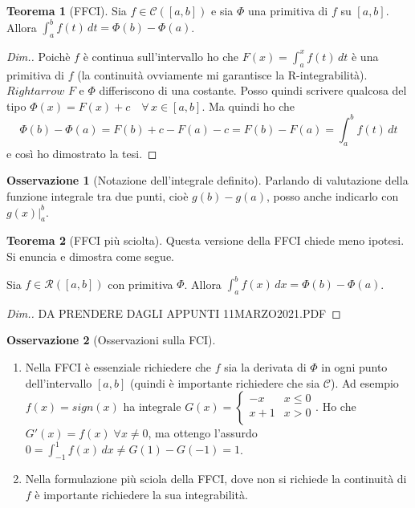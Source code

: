 \documentclass{article}
\theoremstyle{definition}
\newtheorem{theorem}{Teorema}[section]
\theoremstyle{definition}
\theoremstyle{definition}
\theoremstyle{definition}
\newtheorem{remark}{Osservazione}[section]
\theoremstyle{definition}
\theoremstyle{definition}
\begin{document}
\begin{theorem}[FFCI]
    Sia $f\in\mathcal{C}([a,b])$ e sia $\varPhi$ una primitiva di $f$ su $[a,b]$. Allora $\displaystyle{\int_a^bf(t)\,dt=\varPhi(b)-\varPhi(a)}$.
    \begin{proof}[Dim.]
        Poichè $f$ è continua sull'intervallo ho che $F(x)=\int_a^xf(t)\,dt$ è una primitiva di $f$ (la continuità ovviamente mi garantisce la R-integrabilità).
        $Rightarrow$ $F$ e $\varPhi$ differiscono di una costante. Posso quindi scrivere qualcosa del tipo $\displaystyle{\varPhi(x)=F(x)+c \quad \forall\,x \in [a,b]}$. Ma quindi ho che
        \[
            \varPhi(b)-\varPhi(a) = F(b) + c - F(a) - c = F(b) - F(a) = \int_a^bf(t)\,dt   
        \]
        e così ho dimostrato la tesi.
    \end{proof}
\end{theorem}

\begin{remark}[Notazione dell'integrale definito]
    Parlando di valutazione della funzione integrale tra due punti, cioè $g(b)-g(a)$, posso anche indicarlo con $g(x)\big|_a^b$.
\end{remark}

\begin{theorem}[FFCI più sciolta]
    Questa versione della FFCI chiede meno ipotesi. Si enuncia e dimostra come segue.

    Sia $f\in\mathcal{R}([a,b])$ con primitiva $\varPhi$. Allora $\displaystyle{\int_a^bf(x)\,dx=\varPhi(b)-\varPhi(a)}$.
    \begin{proof}[Dim.]
        DA PRENDERE DAGLI APPUNTI 11MARZO2021.PDF
    \end{proof}
\end{theorem}

\begin{remark}[Osservazioni sulla FCI]
    \begin{enumerate}
        \item [1.] Nella FFCI è essenziale richiedere che $f$ sia la derivata di $\varPhi$ in ogni punto dell'intervallo $[a,b]$ (quindi è importante richiedere che sia $\mathcal{C}$). Ad esempio $f(x)=sign(x)$ ha integrale $G(x)=\begin{cases}
            -x & x \leq 0 \\
            x+1 & x>0\\
        \end{cases}$.
        Ho che $G'(x)=f(x) \; \forall x \neq 0$, ma ottengo l'assurdo $0=\int_{-1}^1f(x)\,dx \neq G(1)-G(-1)=1$.
        \item [2.] Nella formulazione più sciola della FFCI, dove non si richiede la continuità di $f$ è importante richiedere la sua integrabilità. 
    \end{enumerate}
\end{remark}
\end{document}
